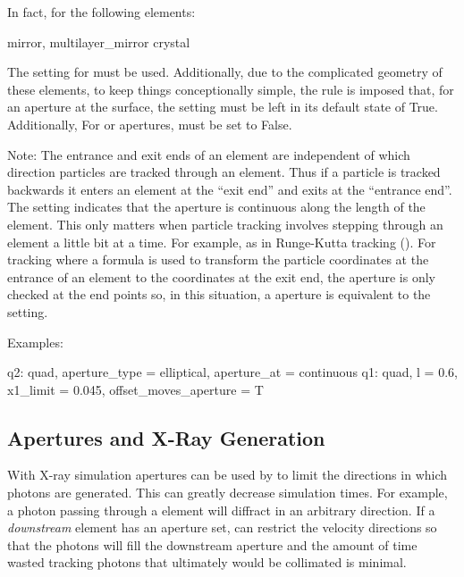 In fact, for the following elements:
\begin{example}
  mirror, 
  multilayer_mirror
  crystal
\end{example}
The  setting for  must be used.
Additionally, due to the complicated geometry of these elements, to
keep things conceptionally simple, the rule is imposed that, for an
aperture at the surface, the  setting must
be left in its default state of True. Additionally, For
 or  apertures,
 must be set to False.

Note: The entrance and exit ends of an element are independent of
which direction particles are tracked through an element. Thus if a
particle is tracked backwards it enters an element at the ``exit end''
and exits at the ``entrance end''. The  setting
indicates that the aperture is continuous along the length of the
element. This only matters when particle tracking involves stepping
through an element a little bit at a time. For example, as in
Runge-Kutta tracking (). For tracking where a formula is
used to transform the particle coordinates at the entrance of an
element to the coordinates at the exit end, the aperture is only
checked at the end points so, in this situation, a 
aperture is equivalent to the  setting.

Examples:
\begin{example}
  q2: quad, aperture_type = elliptical, aperture_at = continuous
  q1: quad, l = 0.6, x1_limit = 0.045, offset_moves_aperture = T
\end{example}

\subsection{Apertures and X-Ray Generation}
\label{s:aper.x.ray}

With X-ray simulation apertures can be used by \bmad to limit the
directions in which photons are generated. This can greatly decrease
simulation times. For example, a photon passing through a
 element will diffract in an arbitrary
direction. If a {\em downstream} element has an aperture set, \bmad
can restrict the velocity directions so that the photons will fill the
downstream aperture and the amount of time wasted tracking photons
that ultimately would be collimated is minimal.

